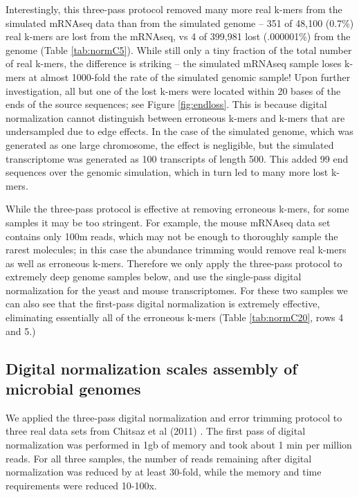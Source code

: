 \documentclass{pnastwo}
\begin{document}
\begin{article}
Interestingly, this three-pass protocol removed many more real k-mers
from the simulated mRNAseq data than from the simulated genome -- 351
of 48,100 (0.7\%) real k-mers are lost from the mRNAseq, vs 4 of
399,981 lost (.000001\%) from the genome (Table \ref{tab:normC5}).
While still only a tiny fraction of the total number of real k-mers,
the difference is striking -- the simulated mRNAseq sample loses k-mers
at almost 1000-fold the rate of the simulated genomic sample!  Upon
further investigation, all but one of the lost k-mers were located
within 20 bases of the ends of the source sequences; see Figure
\ref{fig:endloss}.  This is because digital normalization cannot
distinguish between erroneous k-mers and k-mers that are undersampled
due to edge effects.  In the case of the simulated genome, which was
generated as one large chromosome, the effect is negligible, but the
simulated transcriptome was generated as 100 transcripts of length
500.  This added 99 end sequences over the genomic simulation, which
in turn led to many more lost k-mers.

While the three-pass protocol is effective at removing erroneous
k-mers, for some samples it may be too stringent.  For example, the
mouse mRNAseq data set contains only 100m reads, which may not be
enough to thoroughly sample the rarest molecules; in this case the
abundance trimming would remove real k-mers as well as erroneous k-mers.
Therefore we only apply the three-pass protocol to extremely deep
genome samples below, and use the single-pass digital normalization
for the yeast and mouse transcriptomes.  For these two samples we can
also see that the first-pass digital normalization is extremely effective,
eliminating essentially all of the erroneous k-mers (Table \ref{tab:normC20},
rows 4 and 5.)

\subsection{Digital normalization scales assembly of microbial genomes}

We applied the three-pass digital normalization and error trimming
protocol to three real data sets from Chitsaz et al (2011)
\cite{pubmed21926975}.  The first pass of digital normalization was
performed in 1gb of memory and took about 1 min per million reads.
For all three samples, the number of reads remaining after digital
normalization was reduced by at least 30-fold, while the memory and
time requirements were reduced 10-100x.


\end{article}
\end{document}
